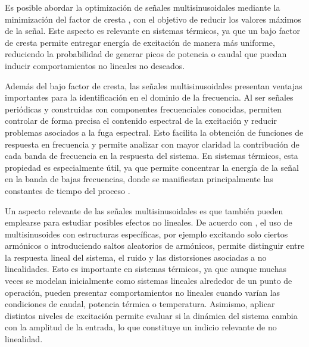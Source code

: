 \documentclass[11pt]{report}
\begin{document}
Es posible abordar la optimización de señales multisinusoidales mediante la minimización del factor de cresta \cite{Retzler2022}, con el objetivo de reducir los valores máximos de la señal. Este aspecto es relevante en sistemas térmicos, ya que un bajo factor de cresta permite entregar energía de excitación de manera más uniforme, reduciendo la probabilidad de generar picos de potencia o caudal que puedan inducir comportamientos no lineales no deseados.

Además del bajo factor de cresta, las señales multisinusoidales presentan ventajas importantes para la identificación en el dominio de la frecuencia. Al ser señales periódicas y construidas con componentes frecuenciales conocidas, permiten controlar de forma precisa el contenido espectral de la excitación y reducir problemas asociados a la fuga espectral. Esto facilita la obtención de funciones de respuesta en frecuencia y permite analizar con mayor claridad la contribución de cada banda de frecuencia en la respuesta del sistema. En sistemas térmicos, esta propiedad es especialmente útil, ya que permite concentrar la energía de la señal en la banda de bajas frecuencias, donde se manifiestan principalmente las constantes de tiempo del proceso \cite{ljung1999system}.




Un aspecto relevante de las señales multisinusoidales es que también pueden emplearse para estudiar posibles efectos no lineales. De acuerdo con \cite{csurcsia2020user}, el uso de multisinusoides con estructuras específicas, por ejemplo excitando solo ciertos armónicos o introduciendo saltos aleatorios de armónicos, permite distinguir entre la respuesta lineal del sistema, el ruido y las distorsiones asociadas a no linealidades. Esto es importante en sistemas térmicos, ya que aunque muchas veces se modelan inicialmente como sistemas lineales alrededor de un punto de operación, pueden presentar comportamientos no lineales cuando varían las condiciones de caudal, potencia térmica o temperatura. Asimismo, aplicar distintos niveles de excitación permite evaluar si la dinámica del sistema cambia con la amplitud de la entrada, lo que constituye un indicio relevante de no linealidad.
\end{document}
